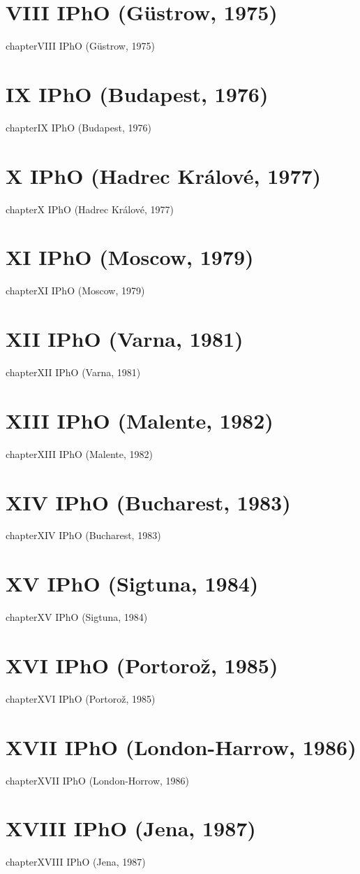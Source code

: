 \documentclass[12pt,a4paper]{book}
\begin{document}
\chapter*{VIII IPhO (G\"ustrow, 1975)}
{chapter}{VIII IPhO (G\"ustrow, 1975)}
\chapter*{IX IPhO (Budapest, 1976)}
{chapter}{IX IPhO (Budapest, 1976)}
\chapter*{X IPhO (Hadrec Kr\'alov\'e, 1977)}
{chapter}{X IPhO (Hadrec Kr\'alov\'e, 1977)}
\chapter*{XI IPhO (Moscow, 1979)}
{chapter}{XI IPhO (Moscow, 1979)}
\chapter*{XII IPhO (Varna, 1981)}
{chapter}{XII IPhO (Varna, 1981)}
\chapter*{XIII IPhO (Malente, 1982)}
{chapter}{XIII IPhO (Malente, 1982)}
\chapter*{XIV IPhO (Bucharest, 1983)}
{chapter}{XIV IPhO (Bucharest, 1983)}
\chapter*{XV IPhO (Sigtuna, 1984)}
{chapter}{XV IPhO (Sigtuna, 1984)}
\chapter*{XVI IPhO (Portoro\v{z}, 1985)}
{chapter}{XVI IPhO (Portoro\v{z}, 1985)}
\chapter*{XVII IPhO (London-Harrow, 1986)}
{chapter}{XVII IPhO (London-Horrow, 1986)}
\chapter*{XVIII IPhO (Jena, 1987)}
{chapter}{XVIII IPhO (Jena, 1987)}
\end{document}
